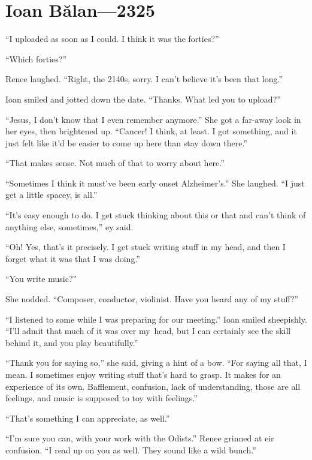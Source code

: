 \hypertarget{ioan-bux103lan-2325}{%
\chapter{Ioan Bălan---2325}\label{ioan-bux103lan-2325}}

``I uploaded as soon as I could. I think it was the forties?''

``Which forties?''

Renee laughed. ``Right, the 2140s, sorry. I can't believe it's been that long.''

Ioan smiled and jotted down the date. ``Thanks. What led you to upload?''

``Jesus, I don't know that I even remember anymore.'' She got a far-away look in her eyes, then brightened up. ``Cancer! I think, at least. I got something, and it just felt like it'd be easier to come up here than stay down there.''

``That makes sense. Not much of that to worry about here.''

``Sometimes I think it must've been early onset Alzheimer's.'' She laughed. ``I just get a little spacey, is all.''

``It's easy enough to do. I get stuck thinking about this or that and can't think of anything else, sometimes,'' ey said.

``Oh! Yes, that's it precisely. I get stuck writing stuff in my head, and then I forget what it was that I was doing.''

``You write music?''

She nodded. ``Composer, conductor, violinist. Have you heard any of my stuff?''

``I listened to some while I was preparing for our meeting.'' Ioan smiled sheepishly. ``I'll admit that much of it was over my\pagebreak\ head, but I can certainly see the skill behind it, and you play beautifully.''

``Thank you for saying so,'' she said, giving a hint of a bow. ``For saying all that, I mean. I sometimes enjoy writing stuff that's hard to grasp. It makes for an experience of its own. Bafflement, confusion, lack of understanding, those are all feelings, and music is supposed to toy with feelings.''

``That's something I can appreciate, as well.''

``I'm sure you can, with your work with the Odists.'' Renee grinned at eir confusion. ``I read up on you as well. They sound like a wild bunch.''

